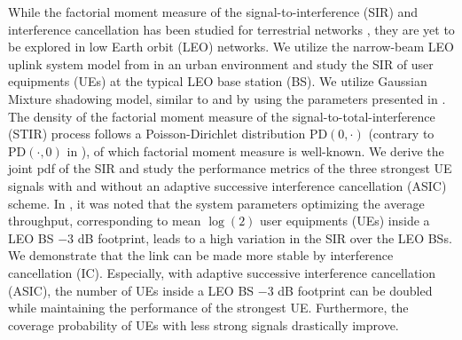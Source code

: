 \documentclass[lettersize,journal]{IEEEtran}
\begin{document}
While the factorial moment measure of the signal-to-interference (SIR)  and interference cancellation has been studied for terrestrial networks \cite{7305791}, they are yet to be explored in low Earth orbit (LEO) networks. We utilize the narrow-beam LEO uplink system model from \cite{10909705} in an urban environment and study the SIR of user equipments (UEs) at the typical LEO base station (BS). We utilize Gaussian Mixture shadowing model, similar to \cite{modelinguplink} and \cite{9684552} by using the parameters presented in \cite{TR38.811}. The density of the factorial moment measure of the signal-to-total-interference (STIR) process follows a Poisson-Dirichlet distribution PD$(0,\cdot)$ (contrary to PD$(\cdot,0)$ in \cite{7305791}), of which factorial moment measure is well-known. We derive the joint pdf of the SIR and study the performance metrics of the three strongest UE signals with and without an adaptive successive interference cancellation (ASIC) scheme. In \cite{10909705}, it was noted that the system parameters optimizing the average throughput, corresponding to mean $\log(2)$ user equipments (UEs) inside a LEO BS $-3$ dB footprint, leads to a high variation in the SIR over the LEO BSs. We demonstrate that the link can be made more stable by interference cancellation (IC). Especially, with adaptive successive interference cancellation (ASIC), the number of UEs inside a LEO BS $-3$ dB footprint can be doubled while maintaining the performance of the strongest UE. Furthermore, the coverage probability of UEs with less strong signals drastically improve.
\end{document}
